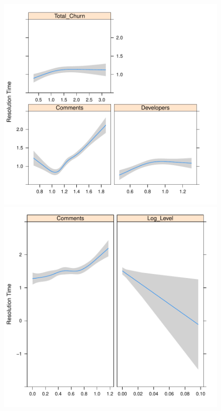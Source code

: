 \begin{figure}[t]
	\begin{minipage}{.5\columnwidth}
		\centering
		
		\includegraphics[width=.95\textwidth]{HadoopDirectionPlot}	
	\end{minipage}
		\begin{minipage}{.5\columnwidth}
			\centering
			
			\includegraphics[width=.95\textwidth]{QpidDirectionPlot}	
		\end{minipage}	
	

\end{figure}

